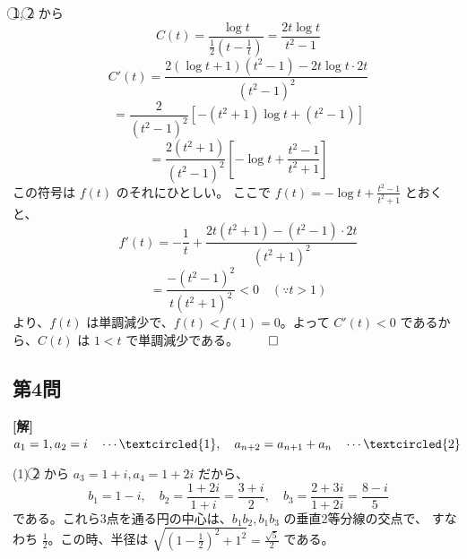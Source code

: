 \documentclass[../main.tex]{subfiles}
\begin{document}
\noindent
\textcircled{1}, \textcircled{2} から
\[
  C(t) = \frac{\log t}{\frac{1}{2}\left(t - \frac{1}{t}\right)} = \frac{2t \log t}{t^2 - 1}
\]
\[
  C'(t) = \frac{2(\log t + 1)(t^2 - 1) - 2t \log t \cdot 2t}{(t^2 - 1)^2}
\]
\[
  = \frac{2}{(t^2 - 1)^2} \left[ -(t^2 + 1)\log t + (t^2 - 1) \right]
\]
\[
  = \frac{2(t^2 + 1)}{(t^2 - 1)^2} \left[ -\log t + \frac{t^2 - 1}{t^2 + 1} \right]
\]
この符号は $f(t)$ のそれにひとしい。
ここで $f(t) = -\log t + \frac{t^2 - 1}{t^2 + 1}$ とおくと、
\[
  f'(t) = -\frac{1}{t} + \frac{2t(t^2 + 1) - (t^2 - 1)\cdot 2t}{(t^2 + 1)^2}
\]
\[
  = \frac{-(t^2 - 1)^2}{t(t^2 + 1)^2} < 0 \quad (\because t > 1)
\]
より、$f(t)$ は単調減少で、$f(t) < f(1) = 0$。よって $C'(t) < 0$ であるから、$C(t)$ は $1 < t$ で単調減少である。 \hfill $\qed$

\bigskip

\subsection*{第4問}

\noindent
\textbf{[解]} $a_1 = 1, a_2 = i \quad \cdots \textcircled{1}, \quad a_{n+2} = a_{n+1} + a_n \quad \cdots \textcircled{2}$

\medskip

\noindent
(1) \textcircled{2} から $a_3 = 1+i, a_4 = 1+2i$ だから、
\[
  b_1 = 1-i, \quad b_2 = \frac{1+2i}{1+i} = \frac{3+i}{2}, \quad b_3 = \frac{2+3i}{1+2i} = \frac{8-i}{5}
\]
である。これら3点を通る円の中心は、$b_1 b_2, b_1 b_3$ の垂直2等分線の交点で、
すなわち $\frac{1}{2}$。この時、半径は $\sqrt{\left(1 - \frac{1}{2}\right)^2 + 1^2} = \frac{\sqrt{5}}{2}$ である。

\begin{center}
\end{center}
\end{document}
